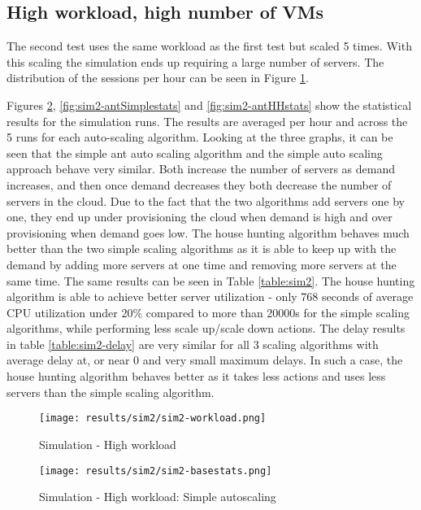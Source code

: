 \subsection{High workload, high number of VMs}

The second test uses the same workload as the first test but scaled 5 times. With this scaling the simulation ends up requiring a large number of servers. The distribution of the sessions per hour can be seen in Figure \ref{fig:sim2-workload}.

Figures \ref{fig:sim2-basestats}, \ref{fig:sim2-antSimplestats} and \ref{fig:sim2-antHHstats} show the statistical results for the simulation runs. The results are averaged per hour and across the 5 runs for each auto-scaling algorithm. Looking at the three graphs, it can be seen that the simple ant auto scaling algorithm and the simple auto scaling approach behave very similar. Both increase the number of servers as demand increases, and then once demand decreases they both decrease the number of servers in the cloud. Due to the fact that the two algorithms add servers one by one, they end up under provisioning the cloud when demand is high and over provisioning when demand goes low. The house hunting algorithm behaves much better than the two simple scaling algorithms as it is able to keep up with the demand by adding more servers at one time and removing more servers at the same time. The same results can be seen in Table \ref{table:sim2}. The house hunting algorithm is able to achieve better server utilization - only 768 seconds of average CPU utilization under 20\% compared to more than 20000s for the simple scaling algorithms, while performing less scale up/scale down actions. The delay results in table \ref{table:sim2-delay} are very similar for all 3 scaling algorithms with average delay at, or near 0 and very small maximum delays. In such a case, the house hunting algorithm behaves better as it takes less actions and uses less servers than the simple scaling algorithm.

\begin{figure}
	\centering
		\texttt{[image: results/sim2/sim2-workload.png]}
	\caption{Simulation - High workload}
	\label{fig:sim2-workload}
\end{figure}

\begin{figure}
	\centering
		\texttt{[image: results/sim2/sim2-basestats.png]}
	\caption{Simulation - High workload: Simple autoscaling}
	\label{fig:sim2-basestats}
\end{figure}

